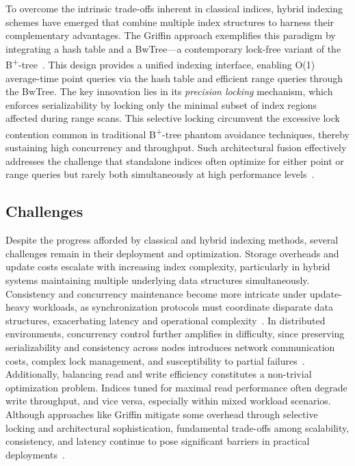 \documentclass[11pt]{article}
\begin{document}
To overcome the intrinsic trade-offs inherent in classical indices, hybrid indexing schemes have emerged that combine multiple index structures to harness their complementary advantages. The Griffin approach exemplifies this paradigm by integrating a hash table and a BwTree—a contemporary lock-free variant of the B\textsuperscript{+}-tree~\cite{ref35}. This design provides a unified indexing interface, enabling O(1) average-time point queries via the hash table and efficient range queries through the BwTree. The key innovation lies in its \emph{precision locking} mechanism, which enforces serializability by locking only the minimal subset of index regions affected during range scans. This selective locking circumvent the excessive lock contention common in traditional B\textsuperscript{+}-tree phantom avoidance techniques, thereby sustaining high concurrency and throughput. Such architectural fusion effectively addresses the challenge that standalone indices often optimize for either point or range queries but rarely both simultaneously at high performance levels~\cite{ref35}.

\subsection{Challenges}

Despite the progress afforded by classical and hybrid indexing methods, several challenges remain in their deployment and optimization. Storage overheads and update costs escalate with increasing index complexity, particularly in hybrid systems maintaining multiple underlying data structures simultaneously. Consistency and concurrency maintenance become more intricate under update-heavy workloads, as synchronization protocols must coordinate disparate data structures, exacerbating latency and operational complexity~\cite{ref31,ref35}. In distributed environments, concurrency control further amplifies in difficulty, since preserving serializability and consistency across nodes introduces network communication costs, complex lock management, and susceptibility to partial failures~\cite{ref31}. Additionally, balancing read and write efficiency constitutes a non-trivial optimization problem. Indices tuned for maximal read performance often degrade write throughput, and vice versa, especially within mixed workload scenarios. Although approaches like Griffin mitigate some overhead through selective locking and architectural sophistication, fundamental trade-offs among scalability, consistency, and latency continue to pose significant barriers in practical deployments~\cite{ref31,ref35}.
\end{document}
